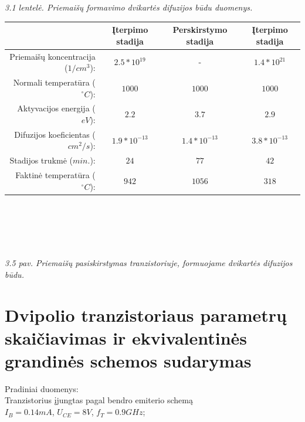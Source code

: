 \documentclass[11pt,a4paper]{article}
\begin{document}
\textsl{3.1 lentelė. Priemaišų formavimo dvikartės difuzijos būdu duomenys.}\\
\begin{tabular}{|r|c|c|c|}\hline
  & Įterpimo stadija & Perskirstymo stadija & Įterpimo stadija \\ \hline
  Priemaišų koncentracija ($1/cm^3$): & $2.5*10^{19}$   & -              & $1.4*10^{21}$ \\ \hline
  Normali temperatūra ($^{\circ}C$):   & $1000$         & $1000$         & $1000$ \\ \hline
  Aktyvacijos energija ($eV$):        & $2.2$          & $3.7$          & $2.9$ \\ \hline
  Difuzijos koeficientas ($cm^2/s$):  & $1.9*10^{-13}$  & $1.4*10^{-13}$  & $3.8*10^{-13}$ \\  \hline
  Stadijos trukmė ($min.$):           & $24$           & $77$           & $42$ \\ \hline
  Faktinė temperatūra ($^{\circ}C$):   & $942$          & $1056$         & $318$ \\ \hline
\end{tabular}\\\\\\
\\

\textsl{3.5 pav. Priemaišų pasiskirstymas tranzistoriuje, formuojame dvikartės difuzijos būdu.}

\section{Dvipolio tranzistoriaus parametrų skaičiavimas ir ekvivalentinės grandinės schemos sudarymas}
Pradiniai duomenys:\\
Tranzistorius įjungtas pagal bendro emiterio schemą\\
$I_B = 0.14 mA$, $U_{CE} = 8V$, $f_{T} = 0.9 GHz$;\\
\end{document}
